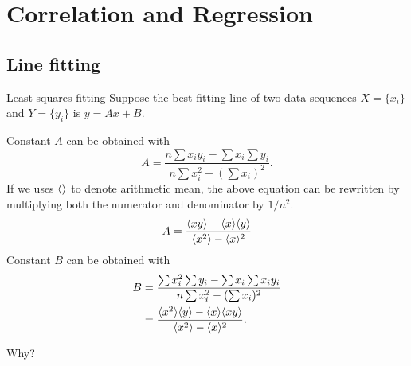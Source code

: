\section{Correlation and Regression}

\subsection{Line fitting}

\begin{fact}{Least squares fitting}{}
    Suppose the best fitting line of two data sequences $X = \{x_i\}$ and $Y = \{y_i\}$ is $y=Ax+B$.
    
    Constant $A$ can be obtained with
    \begin{equation*}
        A = \frac{n\sum x_i y_i - \sum x_i \sum y_i}{n \sum x_i^2 - (\sum x_i)^2}.
    \end{equation*}
    If we uses $\langle\rangle$ to denote arithmetic mean, the above equation can be rewritten by multiplying both the numerator and denominator by $1/n^2$.
    \begin{equation*}
        A = \frac{\langle xy\rangle -\langle x\rangle\langle y\rangle}{\langle x^2\rangle-\langle x\rangle^2}
    \end{equation*}
    Constant $B$ can be obtained with
    \begin{align*}
        B
        &= \frac{\sum x_i^2 \sum y_i - \sum x_i \sum x_i y_i}{n\sum x_i^2 - (\sum x_i)^2} \\
        &= \frac{\langle x^2\rangle\langle y\rangle-\langle x\rangle\langle xy\rangle}{\langle x^2\rangle-\langle x\rangle^2}.
    \end{align*}
       
\end{fact}

\TODO Why?
